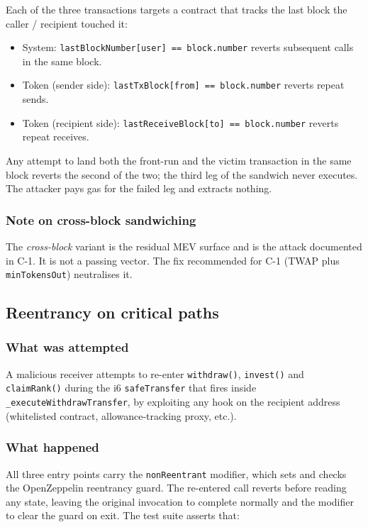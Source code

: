 \documentclass[11pt,a4paper]{article}
\begin{document}
Each of the three transactions targets a contract that tracks the last block
the caller / recipient touched it:

\begin{itemize}[leftmargin=*]
    \item System: \texttt{lastBlockNumber[user] == block.number} reverts
          subsequent calls in the same block.
    \item Token (sender side): \texttt{lastTxBlock[from] == block.number}
          reverts repeat sends.
    \item Token (recipient side):
          \texttt{lastReceiveBlock[to] == block.number} reverts repeat
          receives.
\end{itemize}

Any attempt to land both the front-run and the victim transaction in the
same block reverts the second of the two; the third leg of the sandwich
never executes. The attacker pays gas for the failed leg and extracts
nothing.

\subsubsection*{Note on cross-block sandwiching}

The \emph{cross-block} variant is the residual MEV surface and is the
attack documented in C-1. It is not a passing vector. The fix recommended
for C-1 (TWAP plus \texttt{minTokensOut}) neutralises it.

\subsection{Reentrancy on critical paths}

\subsubsection*{What was attempted}

A malicious receiver attempts to re-enter \texttt{withdraw()},
\texttt{invest()} and \texttt{claimRank()} during the i6 \texttt{safeTransfer}
that fires inside \texttt{\_executeWithdrawTransfer}, by exploiting any
hook on the recipient address (whitelisted contract, allowance-tracking
proxy, etc.).

\subsubsection*{What happened}

All three entry points carry the \texttt{nonReentrant} modifier, which sets
and checks the OpenZeppelin reentrancy guard. The re-entered call reverts
before reading any state, leaving the original invocation to complete
normally and the modifier to clear the guard on exit. The test suite
asserts that:
\end{document}
